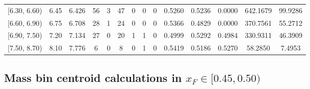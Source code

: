 \begin{table}[htbp]
{\begin{tabular}{cc|c|cccccc|ccc|cc}
        {[6.30, 6.60)} & 6.45 & 6.426 & 56 & 3 & 47 & 0 & 0 & 0 & 0.5260 & 0.5236 & 0.0000 & 642.1679 & 99.9286 \\
        {[6.60, 6.90)} & 6.75 & 6.708 & 28 & 1 & 24 & 0 & 0 & 0 & 0.5366 & 0.4829 & 0.0000 & 370.7561 & 55.2712 \\
        {[6.90, 7.50)} & 7.20 & 7.134 & 27 & 0 & 20 & 1 & 1 & 0 & 0.4999 & 0.5292 & 0.4984 & 330.9311 & 46.3909 \\
        {[7.50, 8.70)} & 8.10 & 7.776 & 6 & 0 & 8 & 0 & 1 & 0 & 0.5419 & 0.5186 & 0.5270 & 58.2850 & 7.4953 \\
        \hline\hline
    \end{tabular}
    }
\end{table}

\clearpage
\subsection{\texorpdfstring{Mass bin centroid calculations in $x_F \in [0.45, 0.50)$}{Mass bin centroid calculations in x\_F in [0.45, 0.50)]}}

